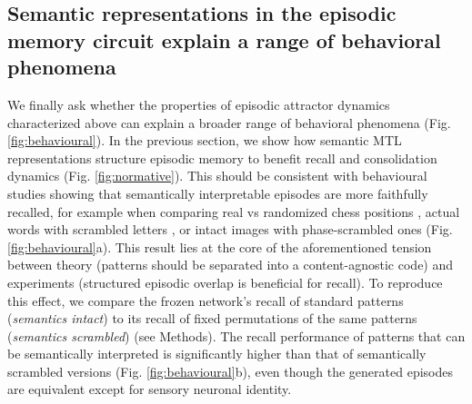 \documentclass{article}
\begin{document}
\subsection*{Semantic representations in the episodic memory circuit explain a range of behavioral phenomena}
We finally ask whether the properties of episodic attractor dynamics characterized above can explain a broader range of behavioral phenomena (Fig. \ref{fig:behavioural}). 
\newline\newline
In the previous section, we show how semantic MTL representations structure episodic memory to benefit recall and consolidation dynamics 
(Fig. \ref{fig:normative}). This should be consistent with behavioural studies showing that semantically interpretable episodes are more faithfully recalled, for example when comparing real vs randomized chess positions , actual words with scrambled letters , or intact images with phase-scrambled ones  (Fig. \ref{fig:behavioural}a). This result lies at the core of the aforementioned tension between theory (patterns should be separated into a content-agnostic code) and experiments (structured episodic overlap is beneficial for recall). To reproduce this effect, we compare the frozen network's recall of standard patterns (\textit{semantics intact}) to its recall of fixed permutations of the same patterns (\textit{semantics scrambled}) (see Methods). The recall performance of patterns that can be semantically interpreted is significantly higher than that of semantically scrambled versions (Fig. \ref{fig:behavioural}b), even though the generated episodes are equivalent except for sensory neuronal identity.
\newline\newline
\end{document}
